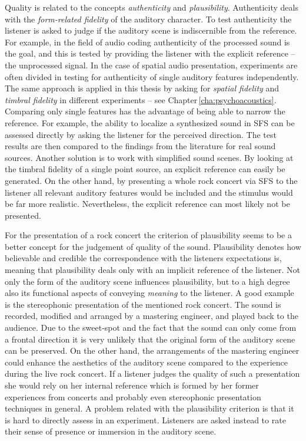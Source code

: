 Quality is related to the concepts \emph{authenticity} and
\emph{plausibility}.
Authenticity deals with the \emph{form-related fidelity}
of the auditory character. To
test authenticity the listener is asked to judge if the auditory scene is
indiscernible from the reference.
For example, in the field of audio coding authenticity of the processed sound is
the goal, and this is tested by providing the listener with the explicit reference --
the unprocessed signal.
In the case of spatial audio presentation, experiments are often divided in
testing for authenticity of single auditory features independently.\autocite[E.g.][]{Rumsey2005}
The same approach is applied in
this thesis by asking for \emph{spatial fidelity} and \emph{timbral fidelity}
in different experiments -- see Chapter\,\ref{cha:psychoacoustics}.
Comparing only single features has the advantage of being able to narrow the
reference. For example, the ability to localize a synthesized sound in \ac{SFS}
can be assessed directly by asking the listener for the perceived direction.
The test results are then compared to the findings from the literature for
real sound sources.
Another solution is to work with simplified sound scenes. By looking at the timbral
fidelity of a single point source, an explicit reference can easily be generated.
On the other hand, by presenting a whole rock concert via \ac{SFS} to the
listener all relevant auditory features would be included and the stimulus would
be far more realistic. Nevertheless, the explicit reference can most likely
not be presented.

For the presentation of a rock concert the criterion of plausibility seems to
be a better concept for the judgement of quality of the sound.
Plausibility denotes how believable and credible the correspondence with the
listeners expectations is,
meaning that plausibility deals only with an implicit reference of the
listener.\autocite{Raake2013}
Not only the form of the auditory scene influences plausibility, but
to a high degree also its functional aspects of conveying \emph{meaning} to the
listener.
A good example is the stereophonic presentation of the mentioned rock concert. The
sound is recorded, modified and arranged by a mastering engineer, and played
back to the audience. Due to the sweet-spot and the fact that the sound
can only come from a frontal direction it is very unlikely that the original
form of the auditory scene can be preserved. On the
other hand, the arrangements of the mastering engineer could enhance the
aesthetics of the auditory scene compared to the experience during the live
rock concert. If a listener judges the quality of such a presentation she
would rely on her internal reference which is formed by her former experiences
from concerts and probably even stereophonic presentation techniques in general.
%
A problem related with the plausibility criterion is that it is hard to directly
assess in an experiment. Listeners are asked instead to rate their sense
of presence or immersion in the auditory scene.

